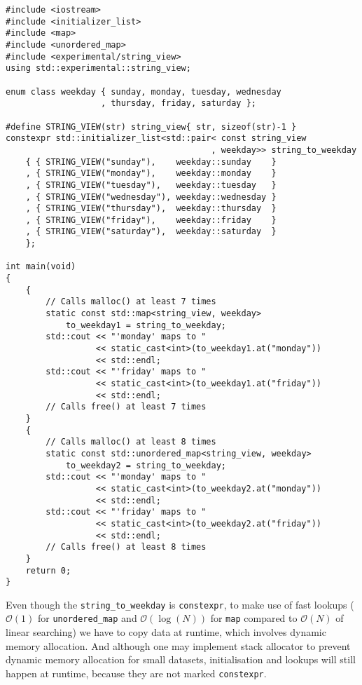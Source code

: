 \documentclass[a4paper,12pt]{article}
\begin{document}
\begin{spacing}{0.8}
\begin{lstlisting}
#include <iostream>
#include <initializer_list>
#include <map>
#include <unordered_map>
#include <experimental/string_view>
using std::experimental::string_view;

enum class weekday { sunday, monday, tuesday, wednesday
                   , thursday, friday, saturday };

#define STRING_VIEW(str) string_view{ str, sizeof(str)-1 }
constexpr std::initializer_list<std::pair< const string_view
                                         , weekday>> string_to_weekday 
    { { STRING_VIEW("sunday"),    weekday::sunday    }
    , { STRING_VIEW("monday"),    weekday::monday    }
    , { STRING_VIEW("tuesday"),   weekday::tuesday   }
    , { STRING_VIEW("wednesday"), weekday::wednesday }
    , { STRING_VIEW("thursday"),  weekday::thursday  }
    , { STRING_VIEW("friday"),    weekday::friday    }
    , { STRING_VIEW("saturday"),  weekday::saturday  }
    };

int main(void)
{
    {
        // Calls malloc() at least 7 times
        static const std::map<string_view, weekday> 
            to_weekday1 = string_to_weekday;
        std::cout << "'monday' maps to " 
                  << static_cast<int>(to_weekday1.at("monday")) 
                  << std::endl;
        std::cout << "'friday' maps to " 
                  << static_cast<int>(to_weekday1.at("friday")) 
                  << std::endl;
        // Calls free() at least 7 times
    }
    {
        // Calls malloc() at least 8 times
        static const std::unordered_map<string_view, weekday> 
            to_weekday2 = string_to_weekday;
        std::cout << "'monday' maps to " 
                  << static_cast<int>(to_weekday2.at("monday")) 
                  << std::endl;
        std::cout << "'friday' maps to " 
                  << static_cast<int>(to_weekday2.at("friday")) 
                  << std::endl;
        // Calls free() at least 8 times
    }
    return 0;
}
\end{lstlisting}
\end{spacing}
    
    Even though the \texttt{string\_to\_weekday} is \texttt{constexpr}, to make use of fast lookups ($\mathcal{O}(1)$ for \texttt{unordered\_map} and $\mathcal{O}(\log(N))$ for \texttt{map} compared to $\mathcal{O}(N)$ of linear searching) we have to copy data at runtime, which involves dynamic memory allocation. And although one may implement stack allocator to prevent dynamic memory allocation for small datasets, initialisation and lookups will still happen at runtime, because they are not marked \texttt{constexpr}.
\end{document}
